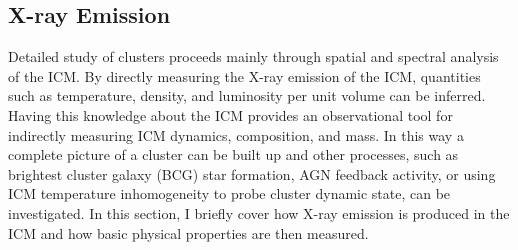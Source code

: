 \subsection{X-ray Emission}
\label{sec:xray}

Detailed study of clusters proceeds mainly through spatial and
spectral analysis of the ICM. By directly measuring the X-ray emission
of the ICM, quantities such as temperature, density, and luminosity
per unit volume can be inferred. Having this knowledge about the ICM
provides an observational tool for indirectly measuring ICM dynamics,
composition, and mass. In this way a complete picture of a cluster can
be built up and other processes, such as brightest cluster galaxy
(BCG) star formation, AGN feedback activity, or using ICM temperature
inhomogeneity to probe cluster dynamic state, can be investigated. In
this section, I briefly cover how X-ray emission is produced in the
ICM and how basic physical properties are then measured.

